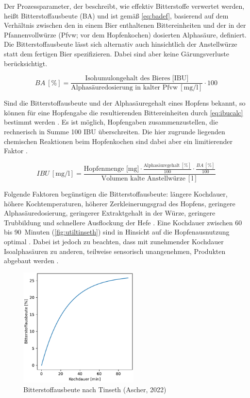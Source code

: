 \documentclass[a4paper,parskip=half]{scrartcl}
\newcommand{\BA}{\mathit{BA}}
\newcommand{\IBU}{\mathit{IBU}}
\newcommand{\uper}{\:[\text{\%}]}
\newcommand{\uli}{\:[\text{l}]}
\newcommand{\ucon}{\:[\text{mg/l}]}
\begin{document}
Der Prozessparameter, der beschreibt, wie effektiv Bitterstoffe verwertet werden, heißt Bitterstoffausbeute (BA) und ist gemäß \autoref{eq:badef}, basierend auf dem Verhältnis zwischen den in einem Bier enthaltenen Bittereinheiten und der in der Pfannenvollwürze (Pfvw; vor dem Hopfenkochen) dosierten Alphasäure, definiert. Die Bitterstoffausbeute lässt sich alternativ auch hinsichtlich der Anstellwürze statt dem fertigen Bier spezifizieren. Dabei sind aber keine Gärungsverluste berücksichtigt. \parencite[163]{Annemueller2015} 

\begin{equation}
\BA \uper = \frac{\text{Isohumulongehalt des Bieres [IBU]}}{\text{Alphasäuredosierung in kalter Pfvw} \ucon} \cdot 100
\label{eq:badef}
\end{equation}

Sind die Bitterstoffausbeute und der Alphasäuregehalt eines Hopfens bekannt, so können für eine Hopfengabe die resultierenden Bittereinheiten durch \autoref{eq:ibucalc} bestimmt werden \parencite{Thesseling2019}. Es ist möglich, Hopfengaben zusammenzustellen, die rechnerisch in Summe 100 IBU überschreiten. Die hier zugrunde liegenden chemischen Reaktionen beim Hopfenkochen sind dabei aber ein limitierender Faktor \parencite{Deutschman2017}.

\begin{equation}
\IBU \ucon = \frac{\text{Hopfenmenge [mg]} \cdot \frac{\text{Alphasäuregehalt} \uper}{100} \cdot \frac{\BA \uper}{100}}{\text{Volumen kalte Anstellwürze} \uli}
\label{eq:ibucalc}
\end{equation}

Folgende Faktoren begünstigen die Bitterstoffausbeute: längere Kochdauer, höhere Kochtemperaturen, höherer Zerkleinerungsgrad des Hopfens, geringere Alphasäuredosierung, geringerer Extraktgehalt in der Würze, geringere Trubbildung und schnellere Ausflockung der Hefe \parencite{Hosom2017}. Eine Kochdauer zwischen 60 bis 90~Minuten (\autoref{fig:utiltinseth}) sind in Hinsicht auf die Hopfenausnutzung optimal \parencite[5]{Malowicki2005}. Dabei ist jedoch zu beachten, dass mit zunehmender Kochdauer Isoalphasäuren zu anderen, teilweise sensorisch unangenehmen, Produkten abgebaut werden \parencite{Kappler2010}.

\begin{figure}[H]
\centering
\includegraphics[width=6cm]{graph_tinseth.pdf}
\caption{Bitterstoffausbeute nach Tinseth (Ascher, 2022)}
\label{fig:utiltinseth}
\end{figure}
\end{document}
